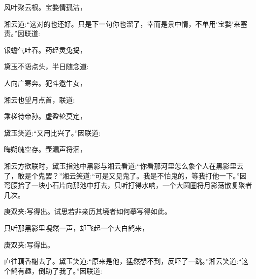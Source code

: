 \begin{poem}
    \begin{pl}风叶聚云根。宝婺情孤洁，\end{pl}
\end{poem}


\begin{parag}
    湘云道:“这对的也还好。只是下一句你也溜了，幸而是景中情，不单用‘宝婺’来塞责。”因联道:
\end{parag}


\begin{poem}
    \begin{pl}银蟾气吐吞。药经灵兔捣，\end{pl}
\end{poem}


\begin{parag}
    黛玉不语点头，半日随念道:
\end{parag}


\begin{poem}
    \begin{pl}人向广寒奔。犯斗邀牛女，\end{pl}
\end{poem}


\begin{parag}
    湘云也望月点首，联道:
\end{parag}


\begin{poem}
    \begin{pl}乘槎待帝孙。虚盈轮莫定，\end{pl}
\end{poem}


\begin{parag}
    黛玉笑道:“又用比兴了。”因联道:
\end{parag}


\begin{poem}
    \begin{pl}晦朔魄空存。壶漏声将涸，\end{pl}
\end{poem}


\begin{parag}
    湘云方欲联时，黛玉指池中黑影与湘云看道:“你看那河里怎么象个人在黑影里去了，敢是个鬼罢？”湘云笑道:“可是又见鬼了。我是不怕鬼的，等我打他一下。”因弯腰拾了一块小石片向那池中打去，只听打得水响，一个大圆圈将月影荡散复聚者几次。\begin{note}庚双夹:写得出。试思若非亲历其境者如何摹写得如此。\end{note}只听那黑影里嘎然一声，却飞起一个大白鹤来，\begin{note}庚双夹:写得出。\end{note}直往藕香榭去了。黛玉笑道:“原来是他，猛然想不到，反吓了一跳。”湘云笑道:“这个鹤有趣，倒助了我了。”因联道:
\end{parag}


